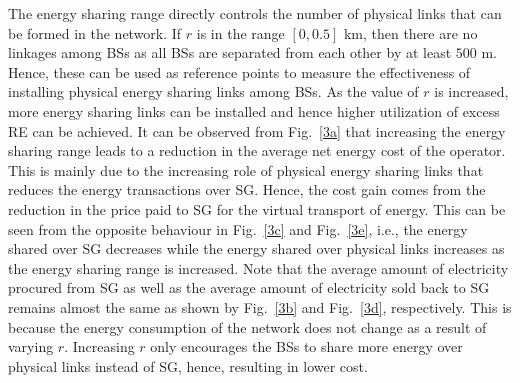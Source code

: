 \documentclass[10pt, letter,twocolumn]{IEEEtran}
\begin{document}
The energy sharing range directly controls the number of physical links that can be formed in the network. If $r$ is in the range $[0 , 0.5]$ km, then there are no linkages among BSs as all BSs are separated from each other by at least $500$ m. Hence, these can be used as reference points to measure the effectiveness of installing physical energy sharing links among BSs. As the value of $r$ is increased, more energy sharing links can be installed and hence higher utilization of excess RE can be achieved. It can be observed from Fig.~\ref{3a} that increasing the energy sharing range leads to a reduction in the average net energy cost of the operator. This is mainly due to the increasing role of physical energy sharing links that reduces the energy transactions over SG. Hence, the cost gain comes from the reduction in the price paid to SG for the virtual transport of energy. This can be seen from the opposite behaviour in Fig.~\ref{3c} and Fig.~\ref{3e}, i.e., the energy shared over SG decreases while the energy shared over physical links increases as the energy sharing range is increased. Note that the average amount of electricity procured from SG as well as the average amount of electricity sold back to SG remains almost the same as shown by Fig.~\ref{3b} and Fig.~\ref{3d}, respectively. This is because the energy consumption of the network does not change as a result of varying $r$.
Increasing $r$ only encourages the BSs to share more energy over physical links instead of SG, hence, resulting in lower cost.
\end{document}
